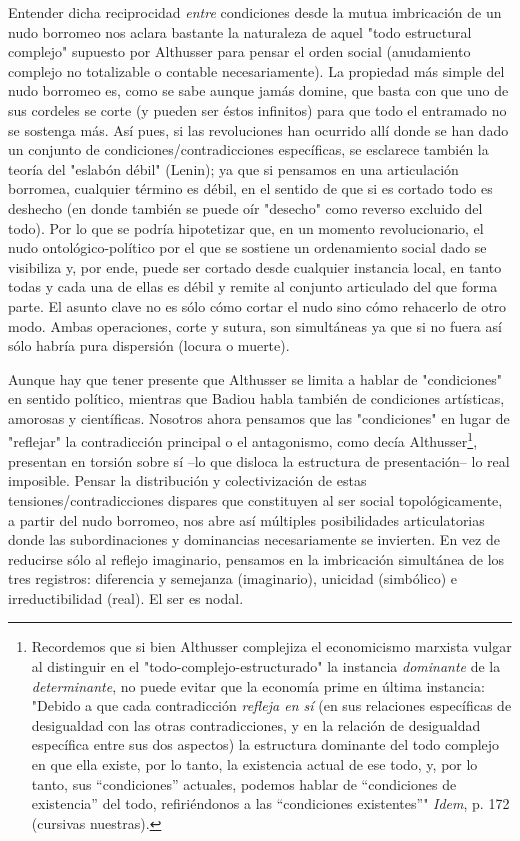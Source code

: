 \documentclass{book}
\begin{document}
Entender dicha reciprocidad \emph{entre} condiciones desde la mutua
imbricación de un nudo borromeo nos aclara bastante la naturaleza de
aquel "todo estructural complejo" supuesto por Althusser para pensar el
orden social (anudamiento complejo no totalizable o contable
necesariamente). La propiedad más simple del nudo borromeo es, como se
sabe aunque jamás domine, que basta con que uno de sus cordeles se corte
(y pueden ser éstos infinitos) para que todo el entramado no se sostenga
más. Así pues, si las revoluciones han ocurrido allí donde se han dado
un conjunto de condiciones/contradicciones específicas, se esclarece
también la teoría del "eslabón débil" (Lenin); ya que si pensamos en una
articulación borromea, cualquier término es débil, en el sentido de que
si es cortado todo es deshecho (en donde también se puede oír "desecho"
como reverso excluido del todo). Por lo que se podría hipotetizar que,
en un momento revolucionario, el nudo ontológico-político por el que se
sostiene un ordenamiento social dado se visibiliza y, por ende, puede
ser cortado desde cualquier instancia local, en tanto todas y cada una
de ellas es débil y remite al conjunto articulado del que forma parte.
El asunto clave no es sólo cómo cortar el nudo sino cómo rehacerlo de
otro modo. Ambas operaciones, corte y sutura, son simultáneas ya que si
no fuera así sólo habría pura dispersión (locura o muerte).

Aunque hay que tener presente que Althusser se limita a hablar de
"condiciones" en sentido político, mientras que Badiou habla también de
condiciones artísticas, amorosas y científicas. Nosotros ahora pensamos
que las "condiciones" en lugar de "reflejar" la contradicción principal
o el antagonismo, como decía Althusser\footnote{Recordemos que si bien
  Althusser complejiza el economicismo marxista vulgar al distinguir en
  el "todo-complejo-estructurado" la instancia \emph{dominante} de la
  \emph{determinante}, no puede evitar que la economía prime en última
  instancia: "Debido a que cada contradicción \emph{refleja en sí} (en
  sus relaciones específicas de desigualdad con las otras
  contradicciones, y en la relación de desigualdad específica entre sus
  dos aspectos) la estructura dominante del todo complejo en que ella
  existe, por lo tanto, la existencia actual de ese todo, y, por lo
  tanto, sus ``condiciones'' actuales, podemos hablar de ``condiciones
  de existencia'' del todo, refiriéndonos a las ``condiciones
  existentes''" \emph{Idem}, p. 172 (cursivas nuestras).}, presentan en
torsión sobre sí --lo que disloca la estructura de presentación-- lo
real imposible. Pensar la distribución y colectivización de estas
tensiones/contradicciones dispares que constituyen al ser social
topológicamente, a partir del nudo borromeo, nos abre así múltiples
posibilidades articulatorias donde las subordinaciones y dominancias
necesariamente se invierten. En vez de reducirse sólo al reflejo
imaginario, pensamos en la imbricación simultánea de los tres registros:
diferencia y semejanza (imaginario), unicidad (simbólico) e
irreductibilidad (real). El ser es nodal.
\end{document}
